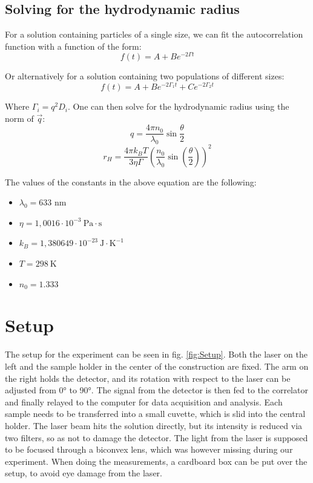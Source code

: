 \documentclass{article}
\begin{document}
\subsection{Solving for the hydrodynamic radius}

For a solution containing particles of a single size, we can fit the autocorrelation function with a function of the form:
\begin{equation}
    f(t) = A + Be^{-2 \Gamma t}
    \label{eq:SingleParticleFit}
\end{equation}

Or alternatively for a solution containing two populations of different sizes:
\begin{equation}
    f(t) = A + Be^{-2 \Gamma_1 t} + Ce^{-2 \Gamma_2 t}
    \label{eq:DoubleParticleFit}
\end{equation}

Where $\Gamma_i = q^2 D_i$. One can then solve for the hydrodynamic radius using the norm of $\Vec{q}$: \begin{equation}
    q = \frac{4 \pi n_0}{\lambda_0}\sin{\frac{\theta}{2}}
\end{equation}
\begin{equation}
    r_H = \frac{4 \pi k_B T}{3 \eta \Gamma} \left( \frac{n_0}{\lambda_0} \sin \left( \frac{\theta}{2} \right) \right)^2
\end{equation}

The values of the constants in the above equation are the following:

\begin{itemize}
    \item $\lambda_0 = 633$ nm
    \item $\eta = 1,0016 \cdot 10^{-3} \ \text{Pa} \cdot \text{s}$ \cite{ViscosityH2O}
    \item $k_B = 1,380649 \cdot 10^{-23} \ \text{J} \cdot \text{K}^{-1}$
    \item $T = 298 \ \text{K}$
    \item $n_0 = 1.333$ \cite{RefractiveIndexH2O}
\end{itemize}

\newpage
\section{Setup}
The setup for the experiment can be seen in fig. \ref{fig:Setup}. Both the laser on the left and the sample holder in the center of the construction are fixed. The arm on the right holds the detector, and its rotation with respect to the laser can be adjusted from 0° to 90°. The signal from the detector is then fed to the correlator and finally relayed to the computer for data acquisition and analysis. Each sample needs to be transferred into a small cuvette, which is slid into the central holder. The laser beam hits the solution directly, but its intensity is reduced via two filters, so as not to damage the detector. The light from the laser is supposed to be focused through a biconvex lens, which was however missing during our experiment. When doing the measurements, a cardboard box can be put over the setup, to avoid eye damage from the laser.
\end{document}
